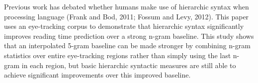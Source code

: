 Previous work has debated whether humans make use of hierarchic syntax when processing language (Frank and Bod, 2011; Fossum and Levy, 2012). This paper uses an eye-tracking corpus to demonstrate that hierarchic syntax significantly improves reading time prediction over a strong n-gram baseline. This study shows that an interpolated 5-gram baseline can be made stronger by combining n-gram statistics over entire eye-tracking regions rather than simply using the last n-gram in each region, but basic hierarchic syntactic measures are still able to achieve significant improvements over this improved baseline.

